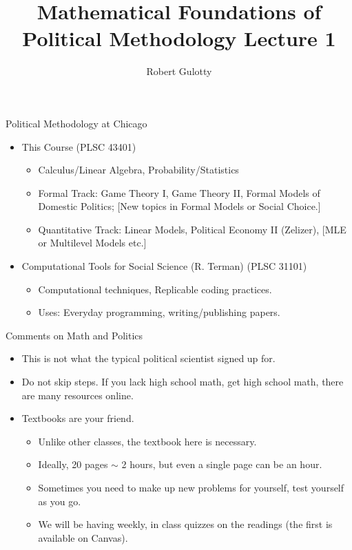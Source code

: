 \documentclass[aspectratio=169]{beamer}
\title[PLSC 43401]{Mathematical Foundations of Political Methodology Lecture 1}
\author{Robert Gulotty}
\institute[University of Chicago]{Department of Political Science \\  University of Chicago}
\date{}
\numberwithin{equation}{section}
\begin{document}
\begin{frame}
\titlepage
\end{frame}



\begin{frame}{Political Methodology at Chicago}

\begin{itemize}
\item This Course (PLSC 43401)
\begin{itemize}
\item Calculus/Linear Algebra, Probability/Statistics
\item Formal Track:  Game Theory I, Game Theory II, Formal Models of Domestic Politics; [New topics in Formal Models or Social Choice.]
\item Quantitative Track:  Linear Models, Political Economy II (Zelizer), [MLE or Multilevel Models etc.]
\end{itemize}
\item Computational Tools for Social Science (R. Terman) (PLSC 31101)
\begin{itemize}
\item Computational techniques, Replicable coding practices.
\item Uses: Everyday programming, writing/publishing papers. 
\end{itemize}
\end{itemize}
\end{frame}


\begin{frame}{Comments on Math and Politics}
\begin{itemize}
\item This is not what the typical political scientist signed up for.\pause
\item Do not skip steps.  If you lack high school math, get high school math, there are many resources online.\pause
\item Textbooks are your friend.  
\begin{itemize}
\item Unlike other classes, the textbook here is necessary.
\item Ideally, 20 pages $\sim$ 2 hours, but even a single page can be an hour.
\item Sometimes you need to make up new problems for yourself, test yourself as you go.
\item We will be having weekly, in class quizzes on the readings (the first is available on Canvas).
\end{itemize}
\end{itemize}


\end{frame}
\end{document}
